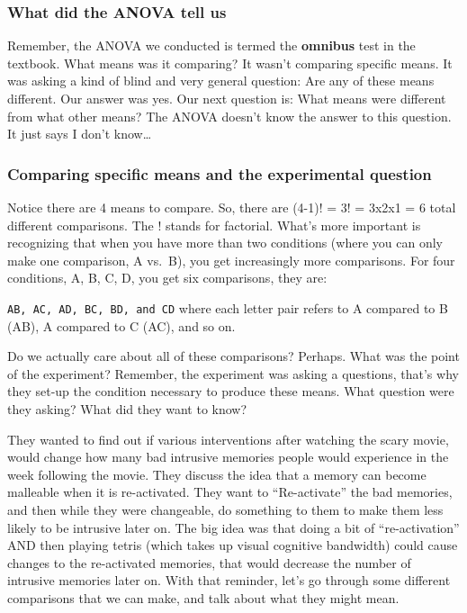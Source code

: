 \documentclass[]{book}
\theoremstyle{definition}
\theoremstyle{definition}
\theoremstyle{definition}
\theoremstyle{remark}
\begin{document}
\subsubsection{What did the ANOVA tell
us}\label{what-did-the-anova-tell-us}

Remember, the ANOVA we conducted is termed the \textbf{omnibus} test in
the textbook. What means was it comparing? It wasn't comparing specific
means. It was asking a kind of blind and very general question: Are any
of these means different. Our answer was yes. Our next question is: What
means were different from what other means? The ANOVA doesn't know the
answer to this question. It just says I don't know\ldots{}

\subsubsection{Comparing specific means and the experimental
question}\label{comparing-specific-means-and-the-experimental-question}

Notice there are 4 means to compare. So, there are (4-1)! = 3! = 3x2x1 =
6 total different comparisons. The ! stands for factorial. What's more
important is recognizing that when you have more than two conditions
(where you can only make one comparison, A vs.~B), you get increasingly
more comparisons. For four conditions, A, B, C, D, you get six
comparisons, they are:

\texttt{AB,\ AC,\ AD,\ BC,\ BD,\ and\ CD} where each letter pair refers
to A compared to B (AB), A compared to C (AC), and so on.

Do we actually care about all of these comparisons? Perhaps. What was
the point of the experiment? Remember, the experiment was asking a
questions, that's why they set-up the condition necessary to produce
these means. What question were they asking? What did they want to know?

They wanted to find out if various interventions after watching the
scary movie, would change how many bad intrusive memories people would
experience in the week following the movie. They discuss the idea that a
memory can become malleable when it is re-activated. They want to
``Re-activate'' the bad memories, and then while they were changeable,
do something to them to make them less likely to be intrusive later on.
The big idea was that doing a bit of ``re-activation'' AND then playing
tetris (which takes up visual cognitive bandwidth) could cause changes
to the re-activated memories, that would decrease the number of
intrusive memories later on. With that reminder, let's go through some
different comparisons that we can make, and talk about what they might
mean.
\end{document}
